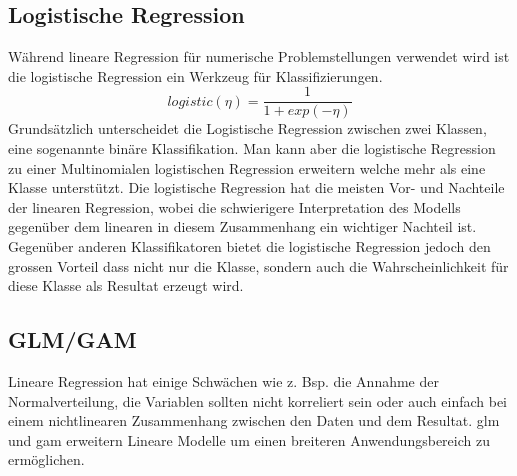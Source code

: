 \documentclass[
  12pt, %
  a4paper, %
  oneside, %
  openany, 
  numbers=noenddot, %
  BCOR=5mm, %
  parskip=half*, %
  thesis, %
]{bfhbook}
\begin{document}
\subsection{Logistische Regression}
\label{logR}
Während lineare Regression für numerische Problemstellungen verwendet wird ist die logistische Regression ein Werkzeug für Klassifizierungen.
\[logistic(\eta)=\frac{1}{1+exp(-\eta)}\]
Grundsätzlich unterscheidet die Logistische Regression zwischen zwei Klassen, eine sogenannte binäre Klassifikation. Man kann aber die logistische Regression zu einer  Multinomialen logistischen Regression erweitern welche mehr als eine Klasse unterstützt.
Die logistische Regression hat die meisten Vor- und Nachteile der linearen Regression, wobei die schwierigere Interpretation des Modells gegenüber dem linearen in diesem Zusammenhang ein wichtiger Nachteil ist. Gegenüber anderen Klassifikatoren bietet die logistische Regression jedoch den grossen Vorteil dass nicht nur die Klasse, sondern auch die Wahrscheinlichkeit für diese Klasse als Resultat erzeugt wird.
\subsection{GLM/GAM}
\label{gam}
Lineare Regression hat einige Schwächen wie z. Bsp. die Annahme der Normalverteilung, die Variablen sollten nicht korreliert sein oder auch einfach bei einem nichtlinearen Zusammenhang zwischen den Daten und dem Resultat. \acrfull{glm} und \acrfull{gam} erweitern Lineare Modelle um einen breiteren Anwendungsbereich zu ermöglichen.
\end{document}
